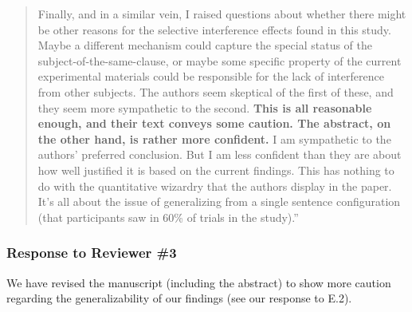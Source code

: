 \documentclass[12pt]{article}
\begin{document}
\begin{quote}
Finally, and in a similar vein, I raised questions about whether there might be other reasons for the selective interference effects found in this study. Maybe a different mechanism could capture the special status of the subject-of-the-same-clause, or maybe some specific property of the current experimental materials could be responsible for the lack of interference from other subjects. The authors seem skeptical of the first of these, and they seem more sympathetic to the second. \textbf{This is all reasonable enough, and their text conveys some caution. The abstract, on the other hand, is rather more confident.} I am sympathetic to the authors' preferred conclusion. But I am less confident than they are about how well justified it is based on the current findings. This has nothing to do with the quantitative wizardry that the authors display in the paper. It's all about the issue of generalizing from a single sentence configuration (that participants saw in 60\% of trials in the study).''
\end{quote}

\subsubsection*{Response to Reviewer \#3}
We have revised the manuscript (including the abstract) to show more caution regarding the generalizability of our findings (see our response to E.2).
\end{document}
